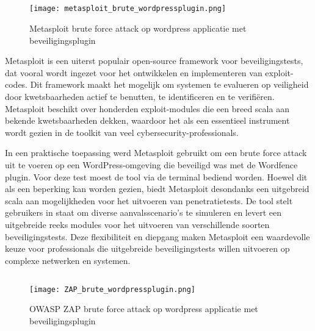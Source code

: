 \subsection{}
\begin{figure}
    \centering
    \texttt{[image: metasploit\_brute\_wordpressplugin.png]}
    \caption[Metasploit brute force attack op wordpress applicatie met beveiligingsplugin]{Metasploit brute force attack op wordpress applicatie met beveiligingsplugin}
\end{figure}
Metasploit is een uiterst populair open-source framework voor beveiligingstests, dat vooral wordt ingezet voor het ontwikkelen en implementeren van exploit-codes. 
Dit framework maakt het mogelijk om systemen te evalueren op veiligheid door kwetsbaarheden actief te benutten, te identificeren 
en te verifiëren. Metasploit beschikt over honderden exploit-modules die een breed scala aan bekende kwetsbaarheden dekken, waardoor het als een essentieel 
instrument wordt gezien in de toolkit van veel cybersecurity-professionals.

In een praktische toepassing werd Metasploit gebruikt om een brute force attack uit te voeren op een WordPress-omgeving die beveiligd was met de Wordfence plugin. 
Voor deze test moest de tool via de terminal bediend worden. Hoewel dit als een beperking kan worden gezien, biedt Metasploit desondanks een uitgebreid scala aan 
mogelijkheden voor het uitvoeren van penetratietests. De tool stelt gebruikers in staat om diverse aanvalsscenario’s te simuleren en levert een uitgebreide reeks 
modules voor het uitvoeren van verschillende soorten beveiligingstests. Deze flexibiliteit en diepgang maken Metasploit een waardevolle keuze voor professionals die 
uitgebreide beveiligingstests willen uitvoeren op complexe netwerken en systemen.

\subsection{}
\begin{figure}
    \centering
    \texttt{[image: ZAP\_brute\_wordpressplugin.png]}
    \caption[OWASP ZAP brute force attack op wordpress applicatie met beveiligingsplugin]{OWASP ZAP brute force attack op wordpress applicatie met beveiligingsplugin}
\end{figure}

